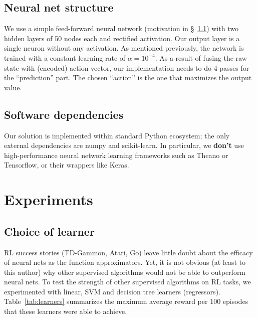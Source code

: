 \documentclass[conference]{IEEEtran}
\begin{document}
\subsection{Neural net structure}
We use a simple feed-forward neural network (motivation in \S~\ref{sec:expts1}) with two hidden layers of 50 nodes each and rectified activation. Our output layer is a single neuron without any activation. As mentioned previously, the network is trained with a constant learning rate of $\alpha=10^{-4}$. As a result of fusing the raw state with (encoded) action vector, our implementation needs to do 4 passes for the ``prediction'' part. The chosen ``action'' is the one that maximizes the output value.
\subsection{Software dependencies}
Our solution is implemented within standard Python ecosystem; the only external dependencies are numpy and scikit-learn. In particular, we {\bf don't} use high-performance neural network learning frameworks such as Theano or Tensorflow, or their wrappers like Keras. 
\section{Experiments}
\subsection{Choice of learner}\label{sec:expts1}
RL success stories (TD-Gammon, Atari, Go) leave little doubt about the efficacy of neural nets as the function approximators. Yet, it is not obvious (at least to this author) why other supervised algorithms would not be able to outperform neural nets. To test the strength of other supervised algorithms on RL tasks, we experimented with linear, SVM and decision tree learners (regressors). Table~\ref{tab:learners} summarizes the maximum average reward per 100 episodes that these learners were able to achieve. 
\end{document}
